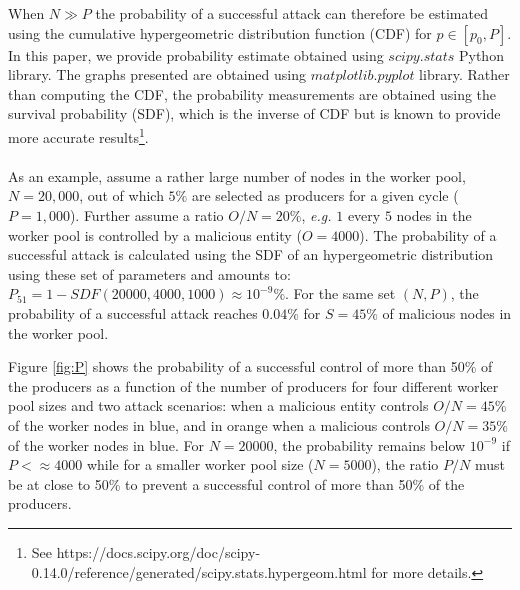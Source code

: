 When $N \gg P$ the probability of a successful attack can therefore be estimated using the cumulative hypergeometric distribution function (CDF) for $p \in [p_0,P]$. In this paper, we provide probability estimate obtained using $scipy.stats$ Python library. The graphs presented are obtained using $matplotlib.pyplot$ library. Rather than computing the CDF, the probability measurements are obtained using the survival probability (SDF), which is the inverse of CDF but is known to provide more accurate results\footnote{See https://docs.scipy.org/doc/scipy-0.14.0/reference/generated/scipy.stats.hypergeom.html for more details.}. \\
\\
As an example, assume a rather large number of nodes in the worker pool, $N = 20,000$, out of which $5\%$ are selected as producers for a given cycle ($P = 1,000$). 
Further assume a ratio $O/N=20\%$, \textit{e.g.} $1$ every $5$ nodes in the worker pool is controlled by a malicious entity ($O=4000$). The probability of a successful attack is calculated using the SDF of an hypergeometric distribution using these set of parameters and amounts to: $P_51 = 1-SDF(20000,4000,1000) \approx 10^{-9}\%$. For the same set $(N,P)$, the probability of a successful attack reaches $0.04\%$ for $S=45\%$ of malicious nodes in the worker pool. 

Figure \ref{fig:P} shows the probability of a successful control of more than 50\% of the producers as a function of the number of producers for four different worker pool sizes and two attack scenarios: when a malicious entity controls $O/N = 45\%$ of the worker nodes in blue, and in orange when a malicious controls $O/N = 35\%$ of the worker nodes in blue. For $N=20000$, the probability remains below $10^{-9}$ if $P < \approx 4000$ while for a smaller worker pool size ($N=5000$), the ratio $P/N$ must be at close to 50\% to prevent a successful control of more than 50\% of the producers. 

